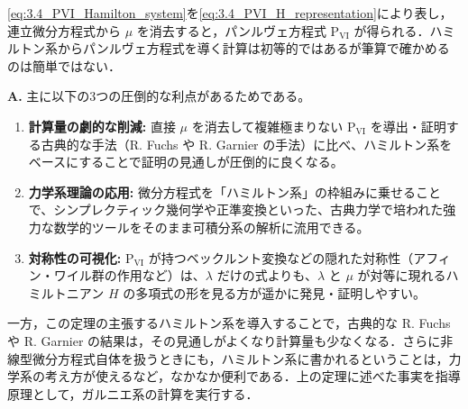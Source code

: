 \eqref{eq:3.4_PVI_Hamilton_system}を\eqref{eq:3.4_PVI_H_representation}により表し，連立微分方程式から $\mu$ を消去すると，パンルヴェ方程式 $\mathrm{P}_{\mathrm{VI}}$ が得られる．ハミルトン系からパンルヴェ方程式を導く計算は初等的ではあるが筆算で確かめるのは簡単ではない．

\begin{Q}
\textbf{A.} 主に以下の3つの圧倒的な利点があるためである。
\begin{enumerate}
    \item \textbf{計算量の劇的な削減:} 直接 $\mu$ を消去して複雑極まりない $\mathrm{P}_{\mathrm{VI}}$ を導出・証明する古典的な手法（R. Fuchs や R. Garnier の手法）に比べ、ハミルトン系をベースにすることで証明の見通しが圧倒的に良くなる。
    \item \textbf{力学系理論の応用:} 微分方程式を「ハミルトン系」の枠組みに乗せることで、シンプレクティック幾何学や正準変換といった、古典力学で培われた強力な数学的ツールをそのまま可積分系の解析に流用できる。
    \item \textbf{対称性の可視化:} $\mathrm{P}_{\mathrm{VI}}$ が持つベックルント変換などの隠れた対称性（アフィン・ワイル群の作用など）は、$\lambda$ だけの式よりも、$\lambda$ と $\mu$ が対等に現れるハミルトニアン $H$ の多項式の形を見る方が遥かに発見・証明しやすい。
\end{enumerate}
\end{Q}

一方，この定理の主張するハミルトン系を導入することで，古典的な R. Fuchs や R. Garnier の結果は，その見通しがよくなり計算量も少なくなる．さらに非線型微分方程式自体を扱うときにも，ハミルトン系に書かれるということは，力学系の考え方が使えるなど，なかなか便利である．上の定理に述べた事実を指導原理として，ガルニエ系の計算を実行する．